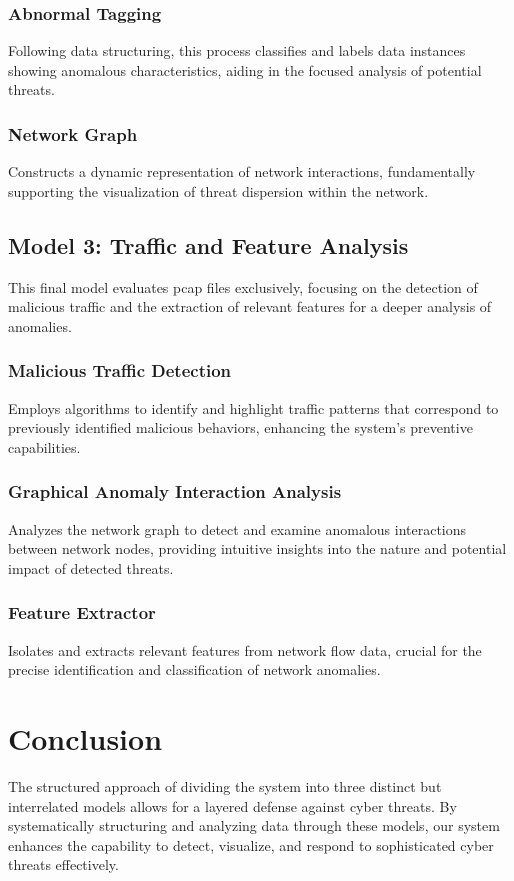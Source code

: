 \subsubsection{Abnormal Tagging}
Following data structuring, this process classifies and labels data instances showing anomalous characteristics, aiding in the focused analysis of potential threats.

\subsubsection{Network Graph}
Constructs a dynamic representation of network interactions, fundamentally supporting the visualization of threat dispersion within the network.

\subsection{Model 3: Traffic and Feature Analysis}
This final model evaluates pcap files exclusively, focusing on the detection of malicious traffic and the extraction of relevant features for a deeper analysis of anomalies.

\subsubsection{Malicious Traffic Detection}
Employs algorithms to identify and highlight traffic patterns that correspond to previously identified malicious behaviors, enhancing the system's preventive capabilities.

\subsubsection{Graphical Anomaly Interaction Analysis}
Analyzes the network graph to detect and examine anomalous interactions between network nodes, providing intuitive insights into the nature and potential impact of detected threats.

\subsubsection{Feature Extractor}
Isolates and extracts relevant features from network flow data, crucial for the precise identification and classification of network anomalies.

\section{Conclusion}
The structured approach of dividing the system into three distinct but interrelated models allows for a layered defense against cyber threats. By systematically structuring and analyzing data through these models, our system enhances the capability to detect, visualize, and respond to sophisticated cyber threats effectively.
